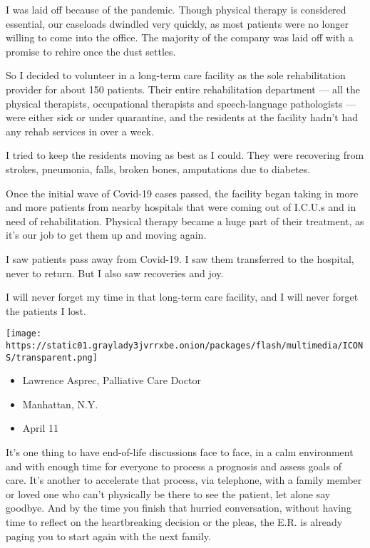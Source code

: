 I was laid off because of the pandemic. Though physical therapy is
considered essential, our caseloads dwindled very quickly, as most
patients were no longer willing to come into the office. The majority of
the company was laid off with a promise to rehire once the dust settles.

So I decided to volunteer in a long-term care facility as the sole
rehabilitation provider for about 150 patients. Their entire
rehabilitation department --- all the physical therapists, occupational
therapists and speech-language pathologists --- were either sick or
under quarantine, and the residents at the facility hadn't had any rehab
services in over a week.

I tried to keep the residents moving as best as I could. They were
recovering from strokes, pneumonia, falls, broken bones, amputations due
to diabetes.

Once the initial wave of Covid-19 cases passed, the facility began
taking in more and more patients from nearby hospitals that were coming
out of I.C.U.s and in need of rehabilitation. Physical therapy became a
huge part of their treatment, as it's our job to get them up and moving
again.

I saw patients pass away from Covid-19. I saw them transferred to the
hospital, never to return. But I also saw recoveries and joy.

I will never forget my time in that long-term care facility, and I will
never forget the patients I lost.

\texttt{[image: https://static01.graylady3jvrrxbe.onion/packages/flash/multimedia/ICONS/transparent.png]}

\begin{itemize}
\tightlist
\item
  Lawrence Asprec, Palliative Care Doctor
\item
  Manhattan, N.Y.
\item
  April 11
\end{itemize}

It's one thing to have end-of-life discussions face to face, in a calm
environment and with enough time for everyone to process a prognosis and
assess goals of care. It's another to accelerate that process, via
telephone, with a family member or loved one who can't physically be
there to see the patient, let alone say goodbye. And by the time you
finish that hurried conversation, without having time to reflect on the
heartbreaking decision or the pleas, the E.R. is already paging you to
start again with the next family.

